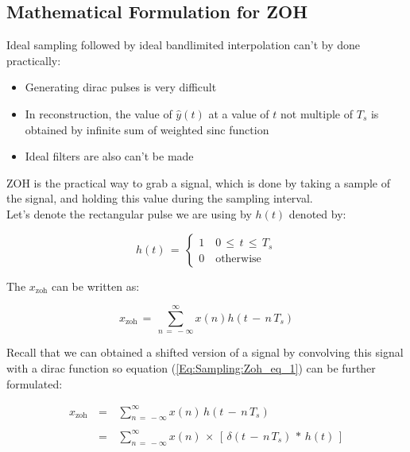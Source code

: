 \subsection{Mathematical Formulation for ZOH}

Ideal sampling followed by ideal bandlimited interpolation can't by done practically:

\begin{itemize}

\item Generating dirac pulses is very difficult

\item In reconstruction, the value of $\hat{y}(t)$ at a value of $t$ not multiple of $T_s$ is obtained by infinite sum of weighted sinc function

\item Ideal filters are also can't be made

\end{itemize}


ZOH is the practical way to grab a signal, which is done by taking a sample of the signal, and holding this value during the sampling interval.\\

Let's denote the rectangular pulse we are using by $h(t)$ denoted by:

\begin{equation}
h(t)\, = \, \begin{cases}
1 \quad 0 \, \leq \, t \, \leq \, T_s \\
0 \quad \text{otherwise}
\end{cases}
\end{equation}

The $x_{\text{zoh}}$ can be written as:

\begin{equation}
x_{\text{zoh}} \, = \, \displaystyle\sum\limits_{n \, = \, -\infty}^{\infty} x(n) h\left(	t \, - \, n\,T_s \right)
\label{Eq:Sampling:Zoh_eq_1}
\end{equation}

Recall that we can obtained a shifted version of a signal by convolving this signal with a dirac function so equation (\ref{Eq:Sampling:Zoh_eq_1}) can be further formulated:

\begin{equation}
\begin{array}{rcl}
x_{\text{zoh}} \, &=& \, \displaystyle\sum\limits_{n \, = \, -\infty}^{\infty} x(n) \, h\left(	t \, - \, n\,T_s \right) \\ \\		
&=& \, \displaystyle\sum\limits_{n \, = \, -\infty}^{\infty} x(n) \, \times \, \left[ \, \delta \left(	t \, - \, n\,T_s \right) \, * \, h(t) \, \right] \\ 
\end{array}
\label{Eq:Sampling:Zoh_eq_2}
\end{equation}


